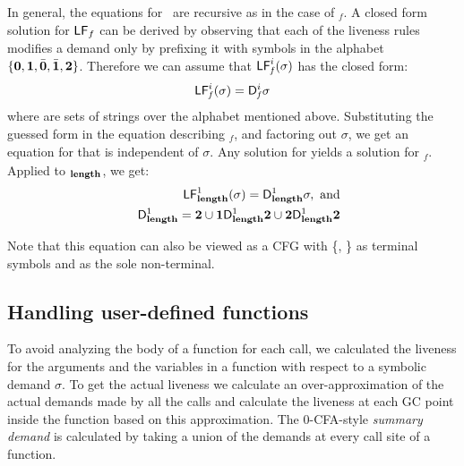 \documentclass[9pt]{sigplanconf}
\begin{document}
In general, the equations for \Lfonly\ are recursive as in the case of
\Lfonly$_\mathit{f}$. A closed  form solution for $\mathsf{LF}_{\mathit \mathit{f}}$
can be derived by observing that each of the liveness rules modifies a
demand  only by  prefixing it  with symbols  in the  alphabet $\lbrace
\mathbf{0}, \mathbf{1},\bar{\mathbf{0}},  \bar{\mathbf{1}}, {\mathbf{2}}  \rbrace$. Therefore we  can assume
that $\mathsf{LF}_{\mathit f}^{i}( {\mathit \sigma})$ has the closed form:
\begin{eqnarray}
\label{eq:LF:DI}
  \mathsf{LF}_{\mathit f}^{i}( {\mathit \sigma}) = \mathsf{D}_{\mathit f}^{i}\sigma
\end{eqnarray}
where   are sets of strings  over the alphabet
mentioned above.  Substituting the  guessed form in the
equation   describing    \Lfonly$_{\mathit   f}$,   and
factoring  out   $\sigma$,  we  get  an   equation  for
  that   is  independent  of   $\sigma$.   Any
solution   for      yields  a   solution   for
\Lfonly$_{\mathit  f}$.   Applied to  \Lfonly$_{\mathit
  {\mathbf{length}}}$, we get:
  \begin{eqnarray*}
&&  \mathsf{LF}_{\mathit {\mathbf{length}} }^{1}( {\mathit \sigma}) = \mathsf{D}_{\mathit {\mathbf{length}}}^{1}\sigma,~\mbox{and}\\
&&   \mathsf{D}_{\mathit {\mathbf{length}}}^{1} = {\mathbf{2}} \cup \mathbf{1}\mathsf{D}_{\mathit {\mathbf{length}}}^{1}{\mathbf{2}}
       \cup {\mathbf{2}}\mathsf{D}_{\mathit {\mathbf{length}}}^{1}{{\mathbf{2}}}
  \end{eqnarray*}

Note that this equation can also be viewed as a CFG with \{\acdr,
\clazy\} as terminal symbols and  as the sole
non-terminal.

\subsection{Handling user-defined functions}
\label{sec:bodylivenessbodies}

To  avoid analyzing  the body  of a  function for  each
call, we calculated the  liveness for the arguments and
the variables in a function  with respect to a symbolic
demand  $\sigma$.   To  get   the  actual  liveness  we
calculate an  over-approximation of the  actual demands
made by  all the  calls and  calculate the  liveness at
each  GC  point  inside  the  function  based  on  this
approximation.  The 0-CFA-style {\em summary demand} is
calculated by  taking a union  of the demands  at every
call site of a function.
\end{document}

